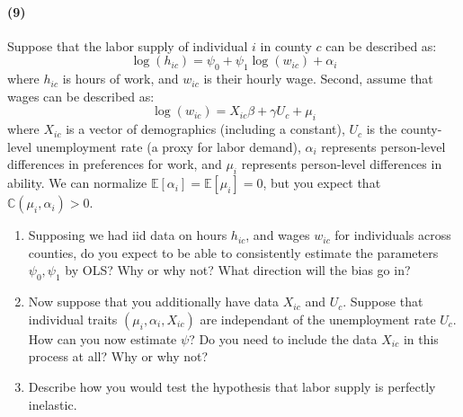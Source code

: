 \documentclass[12pt]{article}
\newcommand\BB{\mathbb}
\newcommand\EE{\mathbb{E}}
\numberwithin{equation}{section}
\numberwithin{figure}{section}
\numberwithin{table}{section}
\begin{document}
\paragraph{(9)}
Suppose that the labor supply of individual $i$ in county $c$ can be described as:
\[\log(h_{ic}) = \psi_0 + \psi_1\log(w_{ic}) + \alpha_i \]
where $h_{ic}$ is hours of work, and $w_{ic}$ is their hourly wage. Second, assume that wages can be described as:
\[\log(w_{ic}) = X_{ic}\beta + \gamma U_c + \mu_i  \]
where $X_{ic}$ is a vector of demographics (including a constant), $U_c$ is the county-level unemployment rate (a proxy for labor demand), $\alpha_i$ represents person-level differences in preferences for work, and $\mu_i$ represents person-level differences in ability. We can normalize $\EE[\alpha_i]=\EE[\mu_i]=0$, but you expect that $\BB{C}(\mu_i,\alpha_i)>0$.
\begin{enumerate}
\item Supposing we had iid data on hours $h_{ic}$, and wages $w_{ic}$ for individuals across counties, do you expect to be able to consistently estimate the parameters $\psi_0,\psi_1$ by OLS? Why or why not? What direction will the bias go in?
\item Now suppose that you additionally have data $X_{ic}$ and $U_c$. Suppose that individual traits $(\mu_i,\alpha_i,X_{ic})$ are independant of the unemployment rate $U_c$. How can you now estimate $\psi$? Do you need to include the data $X_{ic}$ in this process at all? Why or why not?
\item Describe how you would test the hypothesis that labor supply is perfectly inelastic.
\end{enumerate}
\end{document}
